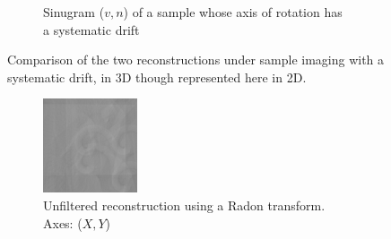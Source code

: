 \begin{figure}
\begin{subfigure}[t]{0.3\textwidth}
    \caption{Sinugram (\(v,n\)) of a sample whose axis of rotation has a systematic drift}
    \label{fig:flopt_helix_sinugram}
  \end{subfigure}
    \hfill
    \label{fig:flopts}
  \caption{Comparison of the two reconstructions under sample imaging with a systematic drift, in 3D though represented here in 2D.}
\end{figure}
\begin{figure}
  \centering
  \hfill
  \begin{subfigure}[t]{0.3\textwidth}
    \includegraphics[width=\textwidth]{Chapters/flopt/Figs/PDF/results/helix/unfilttered_reconstruction_helix_iradon}
    \caption{Unfiltered reconstruction using a \gls{Radon transform}. Axes: (\(X,Y\))} %
    \label{fig:unfilttered_reconstruction_helix_iradon}
  \end{subfigure}\hfill
  \begin{subfigure}[t]{0.3\textwidth}

\end{subfigure}
\end{figure}
